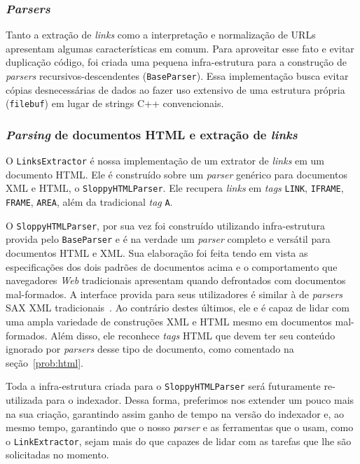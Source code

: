 \documentclass[10pt,twocolumn]{article}
\begin{document}
\subsubsection{\emph{Parsers}}

Tanto a extração de \emph{links} como a interpretação e normalização de
URLs apresentam algumas características em comum. Para aproveitar esse
fato e evitar duplicação código, foi criada uma pequena infra-estrutura para
a construção de \emph{parsers} recursivos-descendentes
(\texttt{BaseParser}). Essa implementação busca evitar cópias
desnecessárias de dados ao fazer uso extensivo de uma estrutura própria
(\texttt{filebuf}) em lugar de strings C++ convencionais.

\subsubsection{\emph{Parsing} de documentos HTML e extração de
\emph{links}}

O \texttt{LinksExtractor} é nossa implementação de um extrator de
\emph{links} em um documento HTML. Ele é construído sobre um
\emph{parser} genérico para documentos XML e HTML, o
\texttt{SloppyHTMLParser}. Ele recupera \emph{links} em \emph{tags}
\texttt{LINK}, \texttt{IFRAME}, \texttt{FRAME}, \texttt{AREA}, além da
tradicional \emph{tag} \texttt{A}.

O \texttt{SloppyHTMLParser}, por sua vez foi construído utilizando
infra-estrutura provida pelo \texttt{BaseParser} e é na verdade um
\emph{parser} completo e versátil para documentos HTML e XML. Sua
elaboração foi feita tendo em vista as especificações dos dois padrões
de documentos acima e o comportamento que navegadores \emph{Web}
tradicionais apresentam quando defrontados com documentos mal-formados.
A interface provida para seus utilizadores é similar à de \emph{parsers}
SAX XML tradicionais~\cite{saxxml, bray2006xml, html4tr}. Ao contrário
destes últimos, ele e é capaz de lidar com uma ampla variedade de
construções XML e HTML mesmo em documentos
mal-formados. Além disso, ele reconhece \emph{tags} HTML que devem ter
seu conteúdo ignorado por \emph{parsers} desse tipo de documento, como
comentado na seção~\ref{prob:html}.

Toda a infra-estrutura criada para o \texttt{SloppyHTMLParser} será
futuramente re-utilizada para o indexador. Dessa forma, preferimos nos
extender um pouco mais na sua criação, garantindo assim ganho de tempo
na versão do indexador e, ao mesmo tempo, garantindo que o nosso
\emph{parser} e as ferramentas que o usam, como o
\texttt{LinkExtractor},  sejam mais do que capazes de lidar com as
tarefas que lhe são solicitadas no momento.
\end{document}
